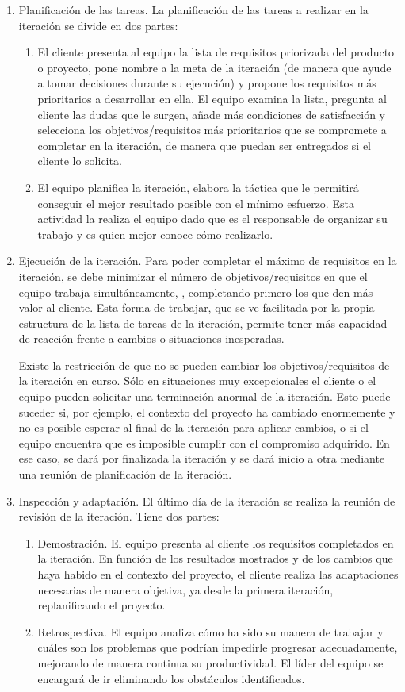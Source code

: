 \begin{enumerate}
\item Planificación de las tareas. La planificación de las tareas a realizar en la iteración se divide en dos partes:
\begin{enumerate}
\item El cliente presenta al equipo la lista de requisitos priorizada del producto o proyecto, pone nombre a la meta de la iteración (de manera que ayude a tomar decisiones durante su ejecución) y propone los requisitos más prioritarios a desarrollar en ella. El equipo examina la lista, pregunta al cliente las dudas que le surgen, añade más condiciones de satisfacción y selecciona los objetivos/requisitos más prioritarios que se compromete a completar en la iteración, de manera que puedan ser entregados si el cliente lo solicita.
\item El equipo planifica la iteración, elabora la táctica que le permitirá conseguir el mejor resultado posible con el mínimo esfuerzo. Esta actividad la realiza el equipo dado que es el responsable de organizar su trabajo y es quien mejor conoce cómo realizarlo.
\end{enumerate}
\item Ejecución de la iteración. Para poder completar el máximo de requisitos en la iteración, se debe minimizar el número de objetivos/requisitos en que el equipo trabaja simultáneamente, , completando primero los que den más valor al cliente. Esta forma de trabajar, que se ve facilitada por la propia estructura de la lista de tareas de la iteración, permite tener más capacidad de reacción frente a cambios o situaciones inesperadas. 

Existe la restricción de que no se pueden cambiar los objetivos/requisitos de la iteración en curso. Sólo en situaciones muy excepcionales el cliente o el equipo pueden solicitar una terminación anormal de la iteración. Esto puede suceder si, por ejemplo, el contexto del proyecto ha cambiado enormemente y no es posible esperar al final de la iteración para aplicar cambios, o si el equipo encuentra que es imposible cumplir con el compromiso adquirido. En ese caso, se dará por finalizada la iteración y se dará inicio a otra mediante una reunión de planificación de la iteración.
\item Inspección y adaptación. El último día de la iteración se realiza la reunión de revisión de la iteración. Tiene dos partes:
\begin{enumerate}
\item Demostración. El equipo presenta al cliente los requisitos completados en la iteración. En función de los resultados mostrados y de los cambios que haya habido en el contexto del proyecto, el cliente realiza las adaptaciones necesarias de manera objetiva, ya desde la primera iteración, replanificando el proyecto.		
\item Retrospectiva. El equipo analiza cómo ha sido su manera de trabajar y cuáles son los problemas que podrían impedirle progresar adecuadamente, mejorando de manera continua su productividad. El líder del equipo se encargará de ir eliminando los obstáculos identificados.
\end{enumerate}
 

\end{enumerate}

